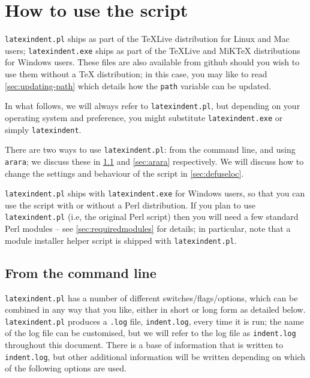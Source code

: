 \section{How to use the script}
 \texttt{latexindent.pl} ships as part of the \TeX Live distribution for
 Linux and Mac users; \texttt{latexindent.exe} ships as part of the \TeX Live and
 MiK\TeX{} distributions for Windows users. These files are also available
 from github \cite{latexindent-home} should you wish to use them without a
 \TeX{} distribution; in this case, you may like to read
 \vref{sec:updating-path} which details how the \texttt{path} variable can be
 updated.

 In what follows, we will always refer to \texttt{latexindent.pl}, but depending on your
 operating system and preference, you might substitute \texttt{latexindent.exe} or simply
 \texttt{latexindent}.

 There are two ways to use \texttt{latexindent.pl}: from the command line, and using
 \texttt{arara}; we discuss these in \cref{sec:commandline} and
 \cref{sec:arara} respectively. We will discuss how to change the settings and
 behaviour of the script in \vref{sec:defuseloc}.

 \texttt{latexindent.pl} ships with \texttt{latexindent.exe} for Windows
 users, so that you can use the script with or without a Perl distribution. If you plan to
 use \texttt{latexindent.pl} (i.e, the original Perl script) then you will need a few standard Perl modules -- see
 \vref{sec:requiredmodules} for details;%
  in particular, note that a module installer helper script is
 shipped with \texttt{latexindent.pl}.

\subsection{From the command line}\label{sec:commandline}
	\texttt{latexindent.pl} has a number of different switches/flags/options, which
	can be combined in any way that you like, either in short or long form as detailed below.
	\texttt{latexindent.pl} produces a \texttt{.log} file, \texttt{indent.log},
	every time it is run; the name of the log file can be customised, but we will refer to
	the log file as \texttt{indent.log} throughout this document. There is a base of
	information that is written to \texttt{indent.log}, but other additional information
	will be written depending on which of the following options are used.

